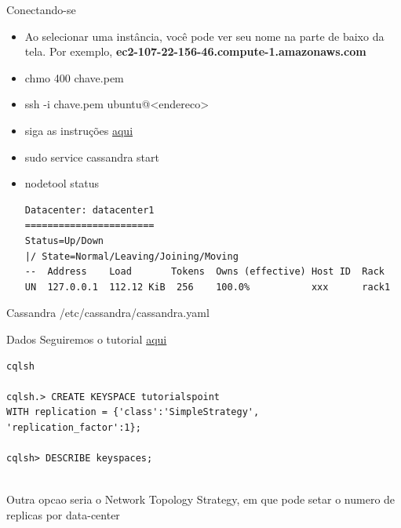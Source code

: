 \begin{frame}{Conectando-se}
\begin{itemize}
	\item Ao selecionar uma instância, você pode ver seu nome na parte de baixo da tela. Por exemplo, \textbf{ec2-107-22-156-46.compute-1.amazonaws.com}
	
	\item chmo 400 chave.pem
	
	\item ssh -i chave.pem ubuntu@<endereco>
	
	\item siga as instruções \href{http://cassandra.apache.org/doc/latest/getting_started/installing.html#installation-from-debian-packages}{aqui}
	
	
	\item sudo service cassandra start
	\item nodetool status

	\begin{scriptsize}
\begin{verbatim}
Datacenter: datacenter1
=======================
Status=Up/Down
|/ State=Normal/Leaving/Joining/Moving
--  Address    Load       Tokens  Owns (effective) Host ID  Rack
UN  127.0.0.1  112.12 KiB  256    100.0%           xxx      rack1
\end{verbatim}	
	\end{scriptsize}
\end{itemize}
\end{frame}

\begin{frame}{Cassandra}
/etc/cassandra/cassandra.yaml
\end{frame}

\begin{frame}{Dados}
Seguiremos o tutorial \href{https://www.tutorialspoint.com/cassandra/cassandra_create_keyspace.htm}{aqui}

\begin{verbatim}
cqlsh
	
cqlsh.> CREATE KEYSPACE tutorialspoint
WITH replication = {'class':'SimpleStrategy',
'replication_factor':1};
	
cqlsh> DESCRIBE keyspaces;


	\end{verbatim}
\end{frame}

Outra opcao seria o Network Topology Strategy, em que pode setar o numero de replicas por data-center

